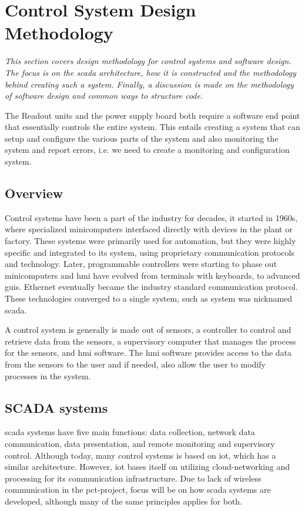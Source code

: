 \documentclass[main.tex]{subfiles}
\begin{document}
\section{Control System Design Methodology}
\textit{This section covers design methodology for control systems and software design. The focus is on the \gls{scada} architecture, how it is constructed and the methodology behind creating such a system. Finally, a discussion is made on the methodology of software design and common ways to structure code.}

The Readout units and the power supply board both require a software end point that essentially controls the entire system. This entails creating a system that can setup and configure the various parts of the system and also monitoring the system and report errors, i.e. we need to create a monitoring and configuration system.

\subsection{Overview}
Control systems have been a part of the industry for decades, it started in 1960s, where specialized minicomputers interfaced directly with devices in the plant or factory\cite{scada_history}. These systems were primarily used for automation, but they were highly specific and integrated to its system, using proprietary communication protocols and technology. Later, programmable controllers were starting to phase out minicomputers and \gls{hmi} have evolved from terminals with keyboards, to advanced \gls{gui}s. Ethernet eventually became the industry standard communication protocol. These technologies converged to a single system, such as system was nicknamed \gls{scada}.


A control system is generally is made out of sensors, a controller to control and retrieve data from the sensors, a supervisory computer that manages the process for the sensors, and \gls{hmi} software. The \gls{hmi} software provides access to the data from the sensors to the user and if needed, also allow the user to modify processes in the system.


\subsection{SCADA systems}
 \gls{scada} systems have five main functions: data collection, network data communication, data presentation, and remote monitoring and supervisory control\cite{scada_intro}. Although today, many control systems is based on \gls{iot}, which has a similar architecture. However, \gls{iot} bases itself on utilizing cloud-networking and processing for its communication infrastructure. Due to lack of wireless communication in the \gls{pct}-project, focus will be on how \gls{scada} systems are developed, although many of the same principles applies for both.
\end{document}

